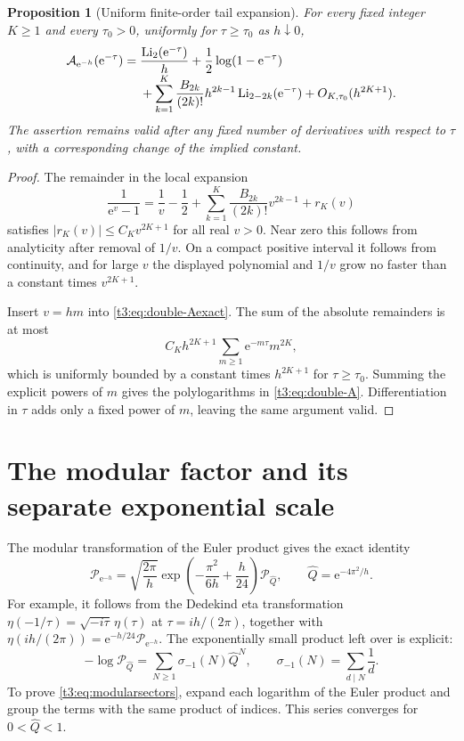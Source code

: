 \documentclass[11pt,openany]{book}
\numberwithin{equation}{chapter}
\theoremstyle{plain}
\newtheorem{proposition}[theorem]{Proposition}
\theoremstyle{definition}
\theoremstyle{remark}
\newcommand{\ee}{\mathrm e}
\newcommand{\Li}{\operatorname{Li}}\newcommand{\rad}{\operatorname{rad}}
\begin{document}
\begin{proposition}[Uniform finite-order tail expansion]\label{t3:prop:double-A}
For every fixed integer $K\ge1$ and every $\tau_0>0$, uniformly for $\tau\ge\tau_0$ as $h\downarrow0$,
\begin{align}\label{t3:eq:double-A}
 \mathcal A_{\ee^{-h}}(\ee^{-\tau})
 ={}&\frac{\Li_2(\ee^{-\tau})}{h}
     +\frac12\log(1-\ee^{-\tau})\\[-0.3em]
 &+\sum_{k=1}^K\frac{B_{2k}}{(2k)!}h^{2k-1}
          \Li_{2-2k}(\ee^{-\tau})
 +O_{K,\tau_0}(h^{2K+1}).\notag
\end{align}
The assertion remains valid after any fixed number of derivatives with respect to $\tau$, with a corresponding change of the implied constant.
\end{proposition}
\begin{proof}
The remainder in the local expansion
\[
 \frac1{\ee^v-1}=\frac1v-\frac12+
   \sum_{k=1}^K\frac{B_{2k}}{(2k)!}v^{2k-1}+r_K(v)
\]
satisfies $|r_K(v)|\le C_Kv^{2K+1}$ for all real $v>0$. Near zero this follows from analyticity after removal of $1/v$. On a compact positive interval it follows from continuity, and for large $v$ the displayed polynomial and $1/v$ grow no faster than a constant times $v^{2K+1}$.

Insert $v=hm$ into \eqref{t3:eq:double-Aexact}. The sum of the absolute remainders is at most
\[
 C_Kh^{2K+1}\sum_{m\ge1}\ee^{-m\tau}m^{2K},
\]
which is uniformly bounded by a constant times $h^{2K+1}$ for $\tau\ge\tau_0$. Summing the explicit powers of $m$ gives the polylogarithms in \eqref{t3:eq:double-A}. Differentiation in $\tau$ adds only a fixed power of $m$, leaving the same argument valid.
\end{proof}

\section{The modular factor and its separate exponential scale}

The modular transformation of the Euler product gives the exact identity \cite{dlmfqmod}
\begin{equation}\label{t3:eq:modularP}
 \mathcal P_{\ee^{-h}}
 =\sqrt{\frac{2\pi}{h}}
   \exp\left(-\frac{\pi^2}{6h}+\frac h{24}\right)
   \mathcal P_{\widehat Q},
 \qquad \widehat Q=\ee^{-4\pi^2/h}.
\end{equation}
For example, it follows from the Dedekind eta transformation
$\eta(-1/\tau)=\sqrt{-i\tau}\,\eta(\tau)$ at $\tau=ih/(2\pi)$, together with
$\eta(ih/(2\pi))=\ee^{-h/24}\mathcal P_{\ee^{-h}}$.
The exponentially small product left over is explicit:
\begin{equation}\label{t3:eq:modularsectors}
 -\log\mathcal P_{\widehat Q}
 =\sum_{N\ge1}\sigma_{-1}(N)\widehat Q^N,
 \qquad\sigma_{-1}(N)=\sum_{d\mid N}\frac1d.
\end{equation}
To prove \eqref{t3:eq:modularsectors}, expand each logarithm of the Euler product and group the terms with the same product of indices. This series converges for $0<\widehat Q<1$.
\end{document}
